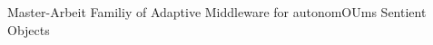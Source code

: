 
\renewcommand*{\acsfont}[1]{\normalfont{\normalsize{#1}}}
\begin{acronym}[ADC]
\setlength{\itemsep}{-\parsep}
	 {Master-Arbeit}
	 {Familiy of Adaptive Middleware for autonomOUms Sentient Objects}
\end{acronym}
